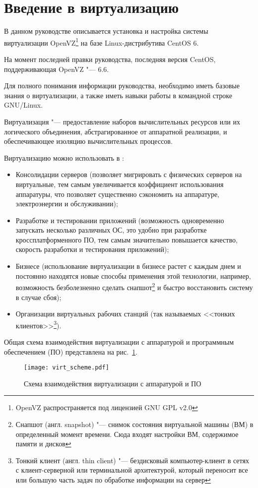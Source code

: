 \section{Введение в виртуализацию}

В данном руководстве описывается установка и настройка системы виртуализации OpenVZ\footnote{OpenVZ распространяется под лицензией GNU GPL v2.0} 
на базе Linux-дистрибутива CentOS 6.

На момент последней правки руководства, последняя версия CentOS, поддерживающая OpenVZ "--- 6.6.

Для полного понимания информации руководства, необходимо иметь базовые знания о виртуализации, а также иметь навыки работы в командной строке GNU/Linux.

Виртуализация "--- предоставление наборов вычислительных ресурсов или их логического объединения, абстрагированное от аппаратной реализации, и обеспечивающее изоляцию вычислительных процессов. 

Виртуализацию можно использовать в \cite{sevconf2014}:
\begin{itemize}
    \item Консолидации серверов (позволяет мигрировать с физических серверов на виртуальные, тем самым увеличивается коэффициент использования аппаратуры, что позволяет существенно сэкономить на аппаратуре, электроэнергии и обслуживании);
    \item Разработке и тестировании приложений (возможность одновременно запускать несколько различных ОС, это удобно при разработке кроссплатформенного ПО, тем самым значительно повышается качество, скорость разработки и тестирования приложений);
    \item Бизнесе (использование виртуализации в бизнесе растет с каждым днем и постоянно находятся новые способы применения этой технологии, например, возможность безболезненно сделать снапшот\footnote{Снапшот (англ. snapshot) "--- снимок состояния виртуальной машины (ВМ) в определенный момент времени. Сюда входят настройки ВМ, содержимое памяти и дисков} и быстро восстановить систему в случае сбоя);
    \item Организации виртуальных рабочих станций (так называемых <<тонких клиентов>>\footnote{Тонкий клиент (англ. thin client) "--- бездисковый компьютер-клиент в сетях с клиент-серверной или терминальной архитектурой, который переносит все или большую часть задач по обработке информации на сервер}).
\end{itemize}

Общая схема взаимодействия виртуализации с аппаратурой и программным обеспечением (ПО) представлена на рис.~\ref{pic:virt_scheme}.
\begin{figure}[ht]
    \centering
	\texttt{[image: virt\_scheme.pdf]}
	\caption{Схема взаимодействия виртуализации с аппаратурой и ПО}\label{pic:virt_scheme}
\end{figure}


